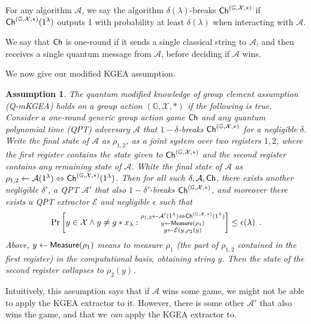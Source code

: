 \documentclass{article}\usepackage[a4paper,margin=20mm]{geometry}
\newtheorem{assumption}[theorem]{Assumption}
\numberwithin{theorem}{section}
\numberwithin{equation}{section}
\newcommand{\G}{\mathbb{G}}
\newcommand{\As}{{\mathcal{A}}}
\newcommand{\Es}{{\mathcal{E}}}
\newcommand{\Xs}{{\mathcal{X}}}
\begin{document}
For any algorithm $\As$, we say the algorithm $\delta(\lambda)$-breaks ${\sf Ch}^{(\G,\Xs,*)}$ if ${\sf Ch}^{(\G,\Xs,*)}(1^\lambda)$ outputs 1 with probability at least $\delta(\lambda)$ when interacting with $\As$.

We say that ${\sf Ch}$ is one-round if it sends a single classical string to $\As$, and then receives a single quantum message from $\As$, before deciding if $\As$ wins.

\medskip

We now give our modified KGEA assumption.

\begin{assumption}\label{def:qmkgea} The \emph{quantum modified knowledge of group element assumption} (Q-mKGEA) holds on a group action $(\G,\Xs,*)$ if the following is true. Consider a one-round generic group action game ${\sf Ch}$ and any quantum polynomial time (QPT) adversary $\As$ that $1-\delta$-breaks ${\sf Ch}^{(\G,\Xs,*)}$ for a negligible $\delta$. Write the final state of $\As$ as $\rho_{1,2}$, as a joint system over two registers $1,2$, where the first register contains the state given to ${\sf Ch}^{(\G,\Xs,*)}$ and the second register contains any remaining state of $\As$. White the final state of $\As$ as $\rho_{1,2}\gets\As(1^\lambda)\Leftrightarrow {\sf Ch}^{(\G,\Xs,*)}(1^\lambda)$. Then for all such $\delta,\As,{\sf Ch}$, there exists another  negligible $\delta'$, a QPT $\As'$ that also $1-\delta'$-breaks ${\sf Ch}^{(\G,\Xs,*)}$, and moreover there exists a QPT extractor $\Es$ and negligible $\epsilon$ such that 
	\[\Pr\left[y\in\Xs\wedge y\neq g*x_\lambda:\substack{\rho_{1,2}\gets\As'(1^\lambda)\Leftrightarrow {\sf Ch}^{(\G,\Xs,*)}(1^\lambda)\\y\gets{\sf Measure}(\rho_1)\\g\gets\Es(y,\rho_2(y)}\right]\leq\epsilon(\lambda)\enspace .\]
	Above, $y\gets{\sf Measure}(\rho_1)$ means to measure $\rho_1$ (the part of $\rho_{1,2}$ contained in the first register) in the computational basis, obtaining string $y$. Then the state of the second register collapses to $\rho_2(y)$.
\end{assumption}

Intuitively, this assumption says that if $\As$ wins some game, we might not be able to apply the KGEA extractor to it. However, there is some other $\As'$ that also wins the game, and that we \emph{can} apply the KGEA extractor to. 
\end{document}
